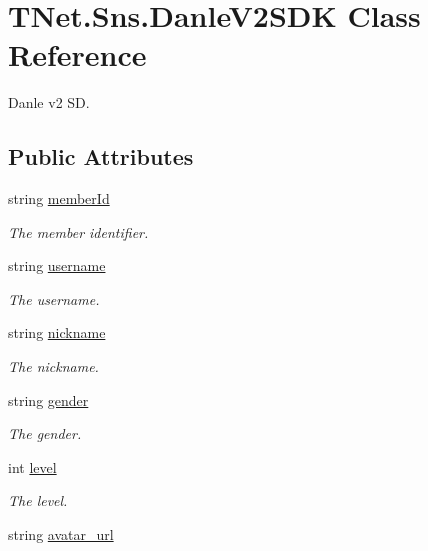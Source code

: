 \hypertarget{class_t_net_1_1_sns_1_1_danle_v2_s_d_k}{}\section{T\+Net.\+Sns.\+Danle\+V2\+S\+DK Class Reference}
\label{class_t_net_1_1_sns_1_1_danle_v2_s_d_k}


Danle v2 SD.  


\subsection*{Public Attributes}
\begin{DoxyCompactItemize}
\item 
string \mbox{\hyperlink{class_t_net_1_1_sns_1_1_danle_v2_s_d_k_ac6e1cf2e23acd71ce73b8eacc856039f}{member\+Id}}
\begin{DoxyCompactList}\small\item\em The member identifier. \end{DoxyCompactList}\item 
string \mbox{\hyperlink{class_t_net_1_1_sns_1_1_danle_v2_s_d_k_a41024b505a8ce91d0088ecb0413b6b79}{username}}
\begin{DoxyCompactList}\small\item\em The username. \end{DoxyCompactList}\item 
string \mbox{\hyperlink{class_t_net_1_1_sns_1_1_danle_v2_s_d_k_ae4b5e2601965e919970c5f19d06a0cde}{nickname}}
\begin{DoxyCompactList}\small\item\em The nickname. \end{DoxyCompactList}\item 
string \mbox{\hyperlink{class_t_net_1_1_sns_1_1_danle_v2_s_d_k_a315f997d43b3f2d27ca9fd92a66ca83d}{gender}}
\begin{DoxyCompactList}\small\item\em The gender. \end{DoxyCompactList}\item 
int \mbox{\hyperlink{class_t_net_1_1_sns_1_1_danle_v2_s_d_k_aa86187b13dd4ba98b551b8695dd5b748}{level}}
\begin{DoxyCompactList}\small\item\em The level. \end{DoxyCompactList}\item 
string \mbox{\hyperlink{class_t_net_1_1_sns_1_1_danle_v2_s_d_k_a06ab9d2c6ac4651f38ed40dcb8261f2d}{avatar\+\_\+url}}

\end{DoxyCompactItemize}
